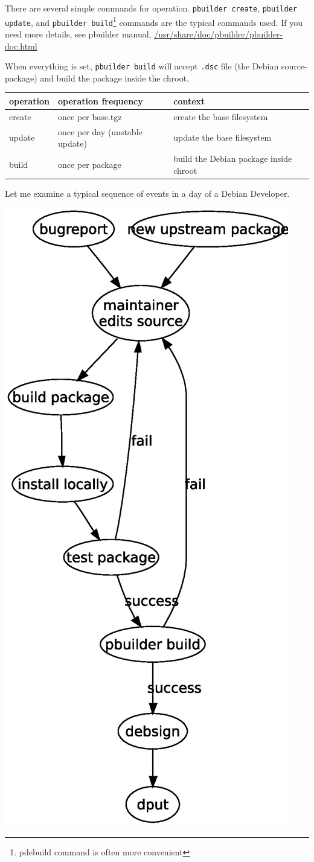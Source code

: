 \documentclass[a4paper]{article}
\begin{document}
There are several simple commands for operation. \texttt{pbuilder
create}, \texttt{pbuilder update}, and \texttt{pbuilder
build}\footnote{pdebuild command is often more convenient} commands are
the typical commands used. If you need more details, see pbuilder
manual, \url{/usr/share/doc/pbuilder/pbuilder-doc.html}

When everything is set, \texttt{pbuilder build} will accept 
\texttt{.dsc} file (the Debian source-package) and build the package
inside the chroot.

\begin{table}[h]
 \begin{tabular}{|l|l|l|}
 \hline
 operation & operation frequency & context \\
 \hline
 create & once per base.tgz & create the base filesystem \\
 update & once per day (unstable update) & update the base filesystem \\
 build & once per package & build the Debian package inside chroot \\
 \hline
 \end{tabular}
\end{table}

Let me examine a typical sequence of events in a day of a Debian Developer.


\begin{center}
 \includegraphics[width=0.6\hsize]{develcycle.eps}
\end{center}
\end{document}

